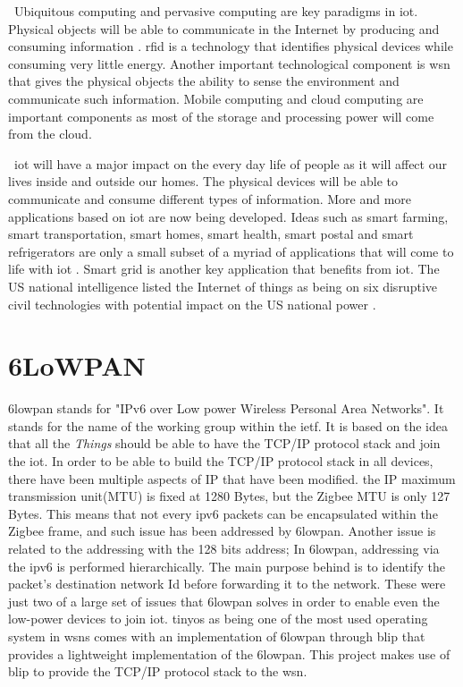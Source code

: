 \documentclass[conference]{IEEEtran}
\begin{document}
\
Ubiquitous computing and pervasive computing are key paradigms in \gls{iot}. Physical objects will be able to communicate in the Internet by producing and consuming information \cite{ref9}. \gls{rfid} is a technology that identifies physical devices while consuming very little energy. Another important technological component is \gls{wsn} that gives the physical objects the ability to sense the environment and communicate such information. Mobile computing and cloud computing are important components as most of the storage and processing power will come from the cloud. 

\
\gls{iot} will have a major impact on the every day life of people as it will affect our lives inside and outside our homes. The physical devices will be able to communicate and consume different types of information. More and more applications based on \gls{iot} are now being developed. Ideas such as smart farming, smart transportation, smart homes, smart health, smart postal and smart refrigerators are only a small subset of a myriad of applications that will come to life with \gls{iot} \cite{ref15}. Smart grid is another key application that benefits from \gls{iot}. The US national intelligence listed the Internet of things as being on six disruptive civil technologies with potential impact on the US national power \cite{ref10}.
\section{6LoWPAN}
\gls{6lowpan} stands for  "IPv6 over Low power Wireless Personal Area Networks". It stands for the name of the working group within the \gls{ietf}. It is based on the idea that all the \textit{Things} should be able to have the TCP/IP protocol stack and join the \gls{iot}. In order to be able to build the TCP/IP protocol stack in all devices, there have been multiple aspects of IP that have been modified. the IP maximum transmission unit(MTU) is fixed at 1280 Bytes, but the Zigbee MTU is only 127 Bytes. This means that not every \gls{ipv6} packets can be encapsulated within the Zigbee frame, and such issue has been addressed by \gls{6lowpan}. Another issue is related to the addressing with the 128 bits address; In \gls{6lowpan}, addressing via the \gls{ipv6} is performed hierarchically. The main purpose behind is to  identify the packet's destination network Id before forwarding it to the network. These were just two of a large set of issues that \gls{6lowpan} solves in order to enable even the low-power devices to join \gls{iot}. \gls{tinyos} as being one of the most used operating system in \glspl{wsn} comes with an implementation of \gls{6lowpan} through \gls{blip} that provides a lightweight implementation of the \gls{6lowpan}. This project makes use of \gls{blip} to provide the TCP/IP protocol stack to the \gls{wsn}.
\end{document}
